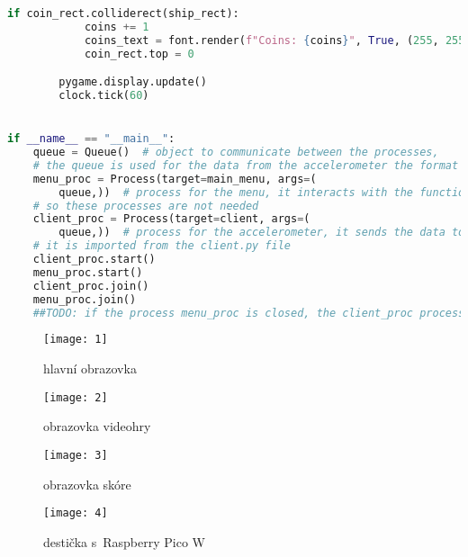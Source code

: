 \documentclass[12pt]{report}			%
\begin{document}
\begin{appendices}
\begin{lstlisting}[title={Program hra.py}, caption={hra.py},  label={lst:hra}, language=Python]
        if coin_rect.colliderect(ship_rect):
            coins += 1
            coins_text = font.render(f"Coins: {coins}", True, (255, 255, 255))
            coin_rect.top = 0

        pygame.display.update()
        clock.tick(60)


if __name__ == "__main__":
    queue = Queue()  # object to communicate between the processes,
    # the queue is used for the data from the accelerometer the format is [x, y, z]
    menu_proc = Process(target=main_menu, args=(
        queue,))  # process for the menu, it interacts with the functions App() and Score(),
    # so these processes are not needed
    client_proc = Process(target=client, args=(
        queue,))  # process for the accelerometer, it sends the data to the queue,
    # it is imported from the client.py file
    client_proc.start()
    menu_proc.start()
    client_proc.join()
    menu_proc.join()
    ##TODO: if the process menu_proc is closed, the client_proc processes should be closed too

\end{lstlisting}
\begin{figure}[h]
\caption{hlavní obrazovka}
\centering
\texttt{[image: 1]}
\end{figure}

\begin{figure}[h]
\caption{obrazovka videohry}
\centering
\texttt{[image: 2]}
\end{figure}

\begin{figure}[h]
\caption{obrazovka skóre}
\centering
\texttt{[image: 3]}
\end{figure}

\begin{figure}[h]
\caption{destička s~Raspberry Pico W}
\centering
\texttt{[image: 4]}
\end{figure}

	\end{appendices}
\end{document}
